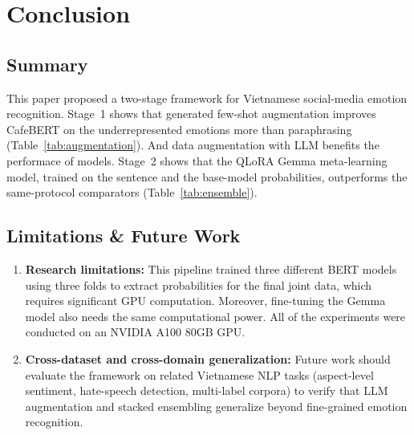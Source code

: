 \documentclass[conference]{IEEEtran}
\begin{document}
\section{Conclusion}

\subsection{Summary}

This paper proposed a two-stage framework for Vietnamese social-media emotion
recognition. Stage~1 shows that generated few-shot augmentation improves CafeBERT
on the underrepresented emotions more than paraphrasing
(Table~\ref{tab:augmentation}). And data augmentation with LLM benefits the performace of models. Stage~2 shows that the QLoRA Gemma meta-learning model,
trained on the sentence and the base-model probabilities, outperforms the
same-protocol comparators (Table~\ref{tab:ensemble}).
\subsection{Limitations \& Future Work}
\begin{enumerate}
\item \textbf{Research limitations:}
    This pipeline trained three different BERT models using three folds to extract probabilities for the final joint data, which requires significant GPU computation. Moreover, fine-tuning the Gemma model also needs the same computational power. All of the experiments were conducted on an NVIDIA A100 80GB GPU.
  \item \textbf{Cross-dataset and cross-domain generalization:}
        Future work should evaluate the framework on related Vietnamese NLP tasks
        (aspect-level sentiment, hate-speech detection, multi-label corpora) to verify
        that LLM augmentation and stacked ensembling generalize beyond fine-grained
        emotion recognition.
\end{enumerate}



\end{document}
